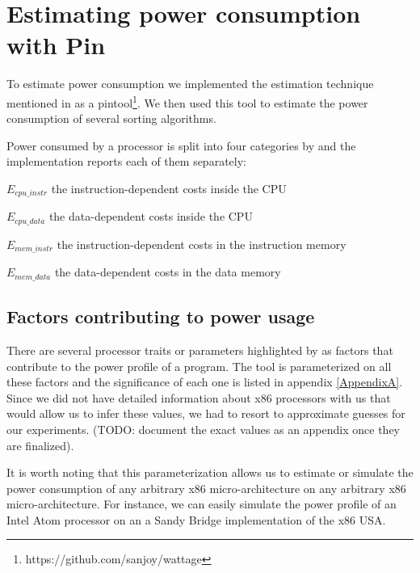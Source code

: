 
\chapter{Estimating power consumption with Pin}

\label{Chapter2}


To estimate power consumption we implemented the estimation technique
mentioned in \cite[Steinke et. al.]{steinke} as a
pintool\footnote{https://github.com/sanjoy/wattage}.  We then used
this tool to estimate the power consumption of several sorting
algorithms.

Power consumed by a processor is split into four categories by
\cite{steinke} and the implementation reports each of them separately:

\begin{description*}
\item[$E_{cpu\_instr}$] the instruction-dependent costs inside the CPU
\item[$E_{cpu\_data}$] the data-dependent costs inside the CPU
\item[$E_{mem\_instr}$] the instruction-dependent costs in the
  instruction memory
\item[$E_{mem\_data}$] the data-dependent costs in the data memory
\end{description*}

\section{Factors contributing to power usage}

There are several processor traits or parameters highlighted by
\cite{steinke} as factors that contribute to the power profile of a
program.  The tool is parameterized on all these factors and the
significance of each one is listed in appendix \ref{AppendixA}.  Since
we did not have detailed information about x86 processors with us that
would allow us to infer these values, we had to resort to approximate
guesses for our experiments.  (TODO: document the exact values as an
appendix once they are finalized).

It is worth noting that this parameterization allows us to estimate or
simulate the power consumption of any arbitrary x86 micro-architecture
on any arbitrary x86 micro-architecture.  For instance, we can easily
simulate the power profile of an Intel Atom processor on an a Sandy
Bridge implementation of the x86 USA.

